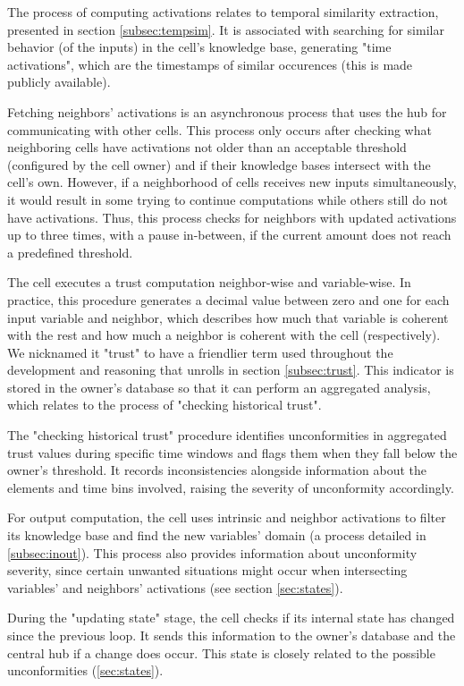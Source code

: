 The process of computing activations relates to temporal similarity extraction, presented in section \ref{subsec:tempsim}. It is associated with searching for similar behavior (of the inputs) in the cell's knowledge base, generating "time activations", which are the timestamps of similar occurences (this is made publicly available).

Fetching neighbors' activations is an asynchronous process that uses the hub for communicating with other cells. This process only occurs after checking what neighboring cells have activations not older than an acceptable threshold (configured by the cell owner) and if their knowledge bases intersect with the cell's own. However, if a neighborhood of cells receives new inputs simultaneously, it would result in some trying to continue computations while others still do not have activations. Thus, this process checks for neighbors with updated activations up to three times, with a pause in-between, if the current amount does not reach a predefined threshold.

The cell executes a trust computation neighbor-wise and variable-wise. In practice, this procedure generates a decimal value between zero and one for each input variable and neighbor, which describes how much that variable is coherent with the rest and how much a neighbor is coherent with the cell (respectively). We nicknamed it "trust" to have a friendlier term used throughout the development and reasoning that unrolls in section \ref{subsec:trust}. This indicator is stored in the owner's database so that it can perform an aggregated analysis, which relates to the process of "checking historical trust".

The "checking historical trust" procedure identifies unconformities in aggregated trust values during specific time windows and flags them when they fall below the owner's threshold. It records inconsistencies alongside information about the elements and time bins involved, raising the severity of unconformity accordingly.

For output computation, the cell uses intrinsic and neighbor activations to filter its knowledge base and find the new variables' domain (a process detailed in \ref{subsec:inout}). This process also provides information about unconformity severity, since certain unwanted situations might occur when intersecting variables' and neighbors' activations (see section \ref{sec:states}).

During the "updating state" stage, the cell checks if its internal state has changed since the previous loop. It sends this information to the owner's database and the central hub if a change does occur. This state is closely related to the possible unconformities (\ref{sec:states}).


